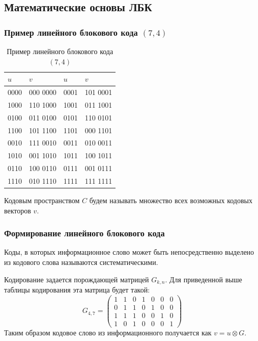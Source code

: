 \subsection{Математические основы ЛБК}


\begin{frame}
    \frametitle{Пример линейного блокового кода $(7,4)$}
    \begin{table}[ht]
        \caption{Пример линейного блокового кода $(7,4)$}\label{t:lbcExample}
        \centering
        \begin{tabular}[c]{|l|l||l|l|}
            \hline\hline
            $u$     &$v$        &$u$    &$v$\\
            \hline\hline
            0000    &000 0000   &0001   &101 0001\\
            1000    &110 1000   &1001   &011 1001\\
            0100    &011 0100   &0101   &110 0101\\
            1100    &101 1100   &1101   &000 1101\\
            0010    &111 0010   &0011   &010 0011\\
            1010    &001 1010   &1011   &100 1011\\
            0110    &100 0110   &0111   &001 0111\\
            1110    &010 1110   &1111   &111 1111\\
            \hline
        \end{tabular}
    \end{table}
    Кодовым пространством $C$ будем называть множество всех возможных кодовых векторов $v$.
\end{frame}


\begin{frame}
    \frametitle{Формирование линейного блокового кода}
    
    \begin{definition}
        Коды, в которых \alert{информационное} слово может быть непосредственно выделено из \alert{кодового} слова называются \alert{систематическими}.
    \end{definition}
    Кодирование задается порождающей матрицей $G_{k,n}$. Для приведенной выше таблицы кодирования эта матрица будет такой:
    \[
        G_{4,7} = 
            \begin{pmatrix}
                1&1&0&1&0&0&0\\
                0&1&1&0&1&0&0\\
                1&1&1&0&0&1&0\\
                1&0&1&0&0&0&1
            \end{pmatrix}
    \]
    Таким образом кодовое слово из информационного получается как $v=u\otimes G$.
\end{frame}


